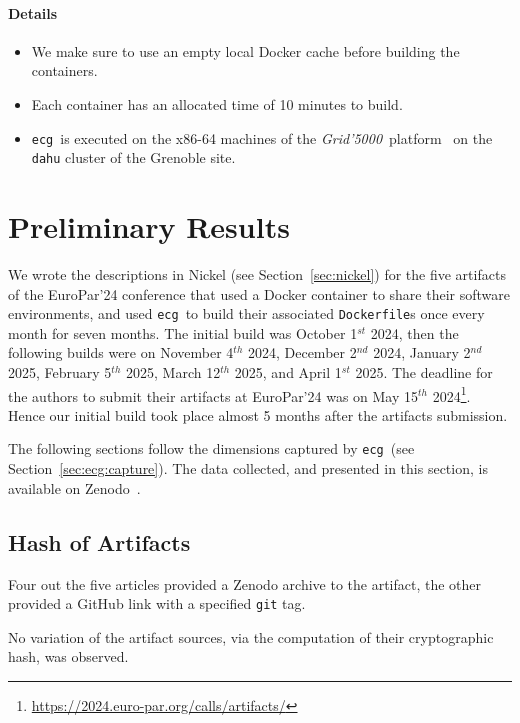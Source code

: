 \documentclass[sigconf,natbib=false]{acmart}
\newcommand{\grid}{\emph{Grid'5000}}
\newcommand{\df}{\texttt{Dockerfile}}
\newcommand{\ecg}{\texttt{ecg}}
\begin{document}
\paragraph{Details}

\begin{itemize}
\item We make sure to use an empty local Docker cache before building the containers.
\item Each container has an allocated time of 10 minutes to build.
\item \ecg\ is executed on the x86-64 machines of the \grid\ platform~\cite{grid5000} on the \texttt{dahu} cluster of the Grenoble site.
\end{itemize}

\section{Preliminary Results}\label{sec:results}

We wrote the descriptions in Nickel (see Section~\ref{sec:nickel}) for the five artifacts of the EuroPar'24 conference that used a Docker container to share their software environments, and used \ecg\ to build their associated \df s once every month for seven months.
The initial build was October 1$^{st}$ 2024, then the following builds were on November 4$^{th}$ 2024, December 2$^{nd}$ 2024, January 2$^{nd}$ 2025, February 5$^{th}$ 2025, March 12$^{th}$ 2025, and April 1$^{st}$ 2025.
The deadline for the authors to submit their artifacts at EuroPar'24 was on May 15$^{th}$ 2024\footnote{\url{https://2024.euro-par.org/calls/artifacts/}}.
Hence our initial build took place almost 5 months after the artifacts submission.


The following sections follow the dimensions captured by \ecg\ (see Section~\ref{sec:ecg:capture}).
The data collected, and presented in this section, is available on Zenodo~\cite{dataset_europar24}.

\subsection{Hash of Artifacts}

Four out the five articles provided a Zenodo archive to the artifact, the other provided a GitHub link with a specified \texttt{git} tag.

No variation of the artifact sources, via the computation of their cryptographic hash, was observed.
\end{document}
